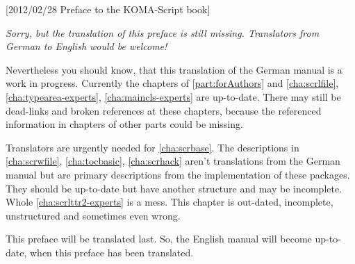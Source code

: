 %
%
%
%
%
%
%
%
%

[2012/02/28 Preface to the KOMA-Script book]



\emph{Sorry, but the translation of this preface is still missing. Translators
  from German to English would be welcome!}

Nevertheless you should know, that this translation of the German
\KOMAScript{} manual is a work in progress. Currently the chapters of
\autoref{part:forAuthors} and \autoref{cha:scrlfile},
\autoref{cha:typearea-experts}, \autoref{cha:maincls-experts} are
up-to-date. There may still be dead-links and broken references at these
chapters, because the referenced information in chapters of other parts could
be missing.

Translators are urgently needed for \autoref{cha:scrbase}. The descriptions in
\autoref{cha:scrwfile}, \autoref{cha:tocbasic}, \autoref{cha:scrhack} aren't
translations from the German manual but are primary descriptions from the
implementation of these packages. They should be up-to-date but have another
structure and may be incomplete. Whole \autoref{cha:scrlttr2-experts} is a
mess. This chapter is out-dated, incomplete, unstructured and sometimes even
wrong.

This preface will be translated last. So, the English manual will become
up-to-date, when this preface has been translated.

\endinput



